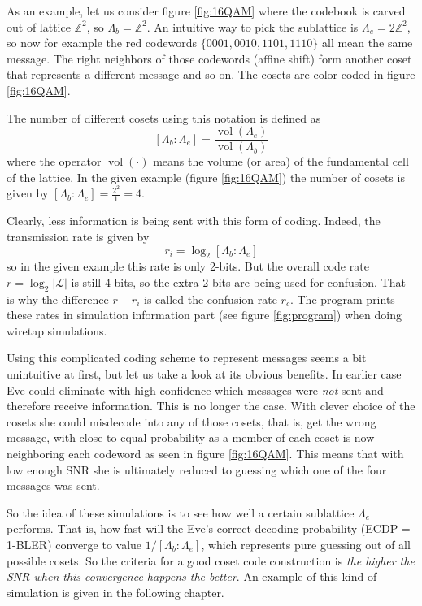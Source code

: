 \documentclass[english,12pt,a4paper,pdftex,sci,utf8]{aaltothesis}
\begin{document}
As an example, let us consider figure \ref{fig:16QAM} where the codebook is carved out of lattice $\mathbb{Z}^2$, so $\Lambda_b = \mathbb{Z}^2$. An intuitive way to pick the sublattice is $\Lambda_e = 2\mathbb{Z}^2$, so now for example the red codewords $\{0001, 0010, 1101, 1110\}$ all mean the same message. The right neighbors of those codewords (affine shift) form another coset that represents a different message and so on. The cosets are color coded in figure \ref{fig:16QAM}.
\par The number of different cosets using this notation is defined as
\begin{equation}
\left[\Lambda_b : \Lambda_e\right] = \frac{\operatorname{vol}(\Lambda_e)}{\operatorname{vol}(\Lambda_b)} 
\end{equation}
where the operator $\operatorname{vol}(\cdot)$ means the volume (or area) of the fundamental cell of the lattice. In the given example (figure \ref{fig:16QAM}) the number of cosets is given by $\left[\Lambda_b : \Lambda_e\right] = \frac{2^2}{1} = 4$. 
\par Clearly, less information is being sent with this form of coding. Indeed, the transmission rate is given by 
\begin{equation}
r_i = \log_2{\left[\Lambda_b : \Lambda_e\right]}
\end{equation}
so in the given example this rate is only 2-bits. But the overall code rate $r=\log_2{|\mathcal{L}|}$ is still 4-bits, so the extra 2-bits are being used for confusion. That is why the difference $r-r_i$ is called the confusion rate $r_c$. The program prints these rates in simulation information part (see figure \ref{fig:program}) when doing wiretap simulations.
\par Using this complicated coding scheme to represent messages seems a bit unintuitive at first, but let us take a look at its obvious benefits. In earlier case Eve could eliminate with high confidence which messages were \emph{not} sent and therefore receive information. This is no longer the case. With clever choice of the cosets she could misdecode into any of those cosets, that is, get the wrong message, with close to equal probability as a member of each coset is now neighboring each codeword as seen in figure \ref{fig:16QAM}. This means that with low enough SNR she is ultimately reduced to guessing which one of the four messages was sent.
\par So the idea of these simulations is to see how well a certain sublattice $\Lambda_e$ performs. That is, how fast will the Eve's correct decoding probability (ECDP = 1-BLER) converge to value $1/\left[\Lambda_b : \Lambda_e\right]$, which represents pure guessing out of all possible cosets. So the criteria for a good coset code construction is \emph{the higher the SNR when this convergence happens the better}. An example of this kind of simulation is given in the following chapter.
\end{document}

